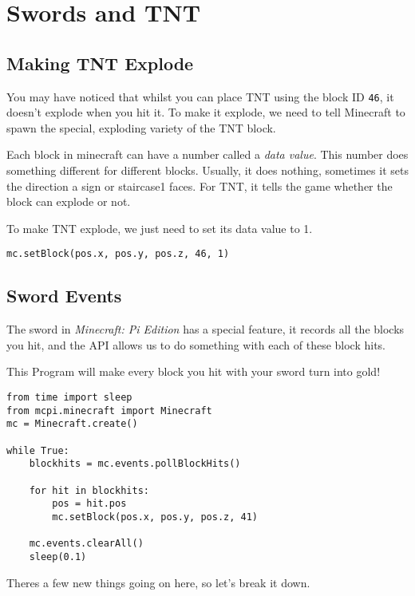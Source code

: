 \section{Swords and TNT}

\subsection*{Making TNT Explode}

You may have noticed that whilst you can place TNT using the block ID \texttt{46}, it doesn't explode when you hit it. To make it explode, we need to tell Minecraft to spawn the special, exploding variety of the TNT block.

Each block in minecraft can have a number called a \textit{data value}. This number does something different for different blocks. Usually, it does nothing, sometimes it sets the direction a sign or staircase1 faces. For TNT, it tells the game whether the block can explode or not.

To make TNT explode, we just need to set its data value to 1.

\begin{lstlisting}[style=Python, numbers=none]
mc.setBlock(pos.x, pos.y, pos.z, 46, 1)
\end{lstlisting}

\pagebreak[1]
\subsection*{Sword Events}

The sword in \textit{Minecraft: Pi Edition} has a special feature, it records all the blocks you hit, and the API allows us to do something with each of these block hits.

This Program will make every block you hit with your sword turn into gold!

\begin{lstlisting}[style=Python, title=minecraftloop.py, breaklines=true]
from time import sleep
from mcpi.minecraft import Minecraft
mc = Minecraft.create()

while True:
	blockhits = mc.events.pollBlockHits()
	
	for hit in blockhits:
		pos = hit.pos
		mc.setBlock(pos.x, pos.y, pos.z, 41)
	
	mc.events.clearAll()
	sleep(0.1)	
\end{lstlisting}

Theres a few new things going on here, so let's break it down.

